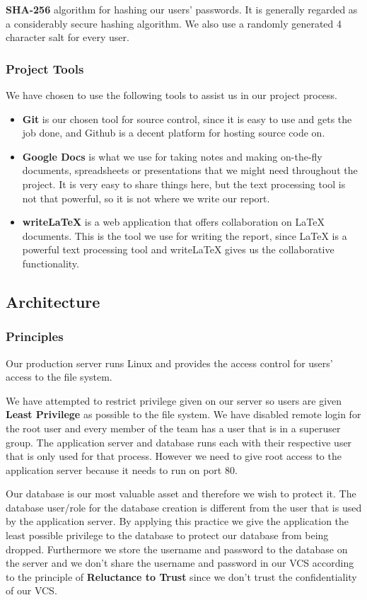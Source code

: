\documentclass[a4paper]{article}
\begin{document}
\textbf{SHA-256} algorithm for hashing our users' passwords. It is generally regarded as a considerably secure hashing algorithm.
We also use a randomly generated 4 character salt for every user.

\subsubsection{Project Tools}
We have chosen to use the following tools to assist us in our project process.
\begin{itemize}
\item \textbf{Git} is our chosen tool for source control, since it is easy to use and gets the job done, and Github is a decent platform for hosting source code on.
\item \textbf{Google Docs} is what we use for taking notes and making on-the-fly documents, spreadsheets or presentations that we might need throughout the project. It is very easy to share things here, but the text processing tool is not that powerful, so it is not where we write our report.
\item \textbf{writeLaTeX} is a web application that offers collaboration on LaTeX documents. This is the tool we use for writing the report, since LaTeX is a powerful text processing tool and writeLaTeX gives us the collaborative functionality.
\end{itemize}

\subsection{Architecture}

\subsubsection{Principles}

Our production server runs Linux and provides the access control for users' access to the file system.

We have attempted to restrict privilege given on our server so users are given 
\textbf{Least Privilege} as possible to the file system. We have disabled remote login for the root user and every member of the team has a user that is in a superuser group. The application server and database runs each with their respective user that is only used for that process. However we need to give root access to the application server because it needs to run on port 80.


Our database is our most valuable asset and therefore we wish to protect it. The database user/role for the database creation is different from the user that is used by the application server. By applying this practice we give the application the least possible privilege to the database to protect our database from being dropped. Furthermore we store the username and password to the database on the server and we don't share the username and password in our VCS according to the principle of \textbf{Reluctance to Trust} since we don't trust the confidentiality of our VCS.
\end{document}

